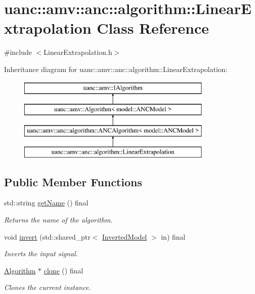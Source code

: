 \hypertarget{classuanc_1_1amv_1_1anc_1_1algorithm_1_1_linear_extrapolation}{}\section{uanc\+:\+:amv\+:\+:anc\+:\+:algorithm\+:\+:Linear\+Extrapolation Class Reference}
\label{classuanc_1_1amv_1_1anc_1_1algorithm_1_1_linear_extrapolation}


{\ttfamily \#include $<$Linear\+Extrapolation.\+h$>$}

Inheritance diagram for uanc\+:\+:amv\+:\+:anc\+:\+:algorithm\+:\+:Linear\+Extrapolation\+:\begin{figure}[H]
\begin{center}
\leavevmode
\includegraphics[height=4.000000cm]{classuanc_1_1amv_1_1anc_1_1algorithm_1_1_linear_extrapolation}
\end{center}
\end{figure}
\subsection*{Public Member Functions}
\begin{DoxyCompactItemize}
\item 
std\+::string \hyperlink{classuanc_1_1amv_1_1anc_1_1algorithm_1_1_linear_extrapolation_afc4328260d3f9c7d8a9be50df5a30e50}{get\+Name} () final
\begin{DoxyCompactList}\small\item\em Returns the name of the algorithm. \end{DoxyCompactList}\item 
void \hyperlink{classuanc_1_1amv_1_1anc_1_1algorithm_1_1_linear_extrapolation_aafb6717c9cb632241b10875630970388}{invert} (std\+::shared\+\_\+ptr$<$ \hyperlink{classuanc_1_1amv_1_1_inverted_model}{Inverted\+Model} $>$ in) final
\begin{DoxyCompactList}\small\item\em Inverts the input signal. \end{DoxyCompactList}\item 
\hyperlink{classuanc_1_1amv_1_1_algorithm}{Algorithm} $\ast$ \hyperlink{classuanc_1_1amv_1_1anc_1_1algorithm_1_1_linear_extrapolation_adbd3916228ea66603c4c5362f3392548}{clone} () final
\begin{DoxyCompactList}\small\item\em Clones the current instance. \end{DoxyCompactList}\end{DoxyCompactItemize}
